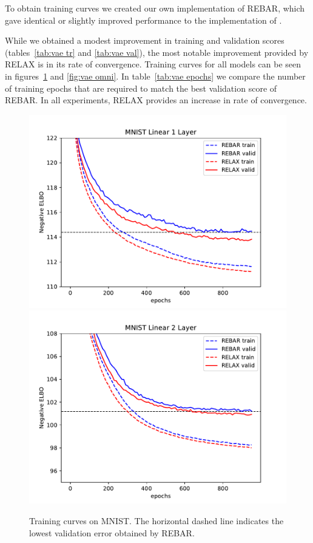 \documentclass{article}
\newcommand{\RELAX}{{\textnormal{RELAX}}}
\begin{document}
To obtain training curves we created our own implementation of REBAR, which gave identical or slightly improved performance to the implementation of \citet{tucker2017rebar}.

While we obtained a modest improvement in training and validation scores (tables~\ref{tab:vae tr} and \ref{tab:vae val}), the most notable improvement provided by \RELAX{} is in its rate of convergence.
Training curves for all models can be seen in figures~\ref{fig:vae mnist} and \ref{fig:vae omni}.
In table~\ref{tab:vae epochs} we compare the number of training epochs that are required to match the best validation score of REBAR.
In all experiments, RELAX provides an increase in rate of convergence. 

\begin{figure}[h]
\centering
\includegraphics[width=.4\textwidth]{figures/MNIST_L1}
\includegraphics[width=.4\textwidth]{figures/MNIST_L2}
\caption{Training curves on MNIST. The horizontal dashed line indicates the lowest validation error obtained by REBAR.}
\label{fig:vae mnist}
\end{figure}
\end{document}
